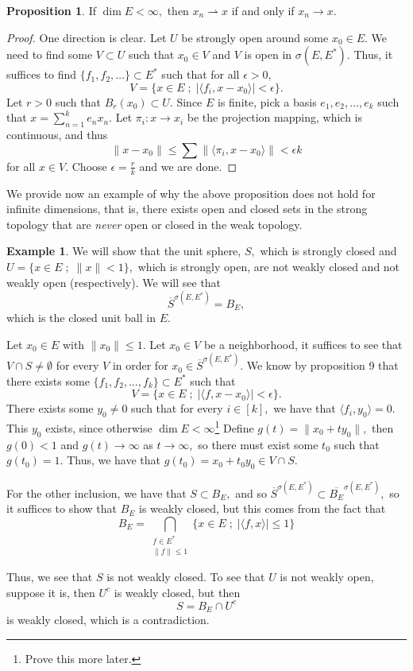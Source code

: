 \documentclass[10pt, oneside]{article}
\theoremstyle{definition}
\newtheorem{exmp}{Example}[section]
\newtheorem{prop}{Proposition}
\begin{document}
\begin{prop}
    If $\dim E < \infty,$ then $x_n \rightharpoonup x$ if and only if $x_n \to x.$
\end{prop}
\begin{proof}
    One direction is clear. Let $U$ be strongly open around some $x_0 \in E.$ We need to find some $V\subset U$ such that $x_0 \in V$ and $V$ is open in $\sigma(E, E^*).$ Thus, it suffices to find $\{f_1, f_2, \dots\} \subset E^*$ such that for all $\epsilon>0,$
    \[V= \{x \in E \; ; \; |\langle f_i, x-x_0\rangle| < \epsilon\}.\] Let $r>0$ such that $B_r(x_0)\subset U.$ Since $E$ is finite, pick a basis $e_1, e_2, \dots, e_k$ such that $x = \sum_{n=1}^k e_nx_n.$ Let $\pi_i: x\to x_i$ be the projection mapping, which is continuous, and thus 
    \[\|x - x_0\|\leq \sum \|\langle \pi_i, x-x_0\rangle\| < \epsilon k\] for all $x\in V.$ Choose $\epsilon = \frac{r}{k}$ and we are done.
\end{proof}

We provide now an example of why the above proposition does not hold for infinite dimensions, that is, there exists open and closed sets in the strong topology that are \textit{never} open or closed in the weak topology.
\begin{exmp}
    We will show that the unit sphere, $S,$ which is strongly closed and $U = \{x \in E \; ; \; \|x\| <1\},$ which is strongly open, are not weakly closed and not weakly open (respectively). We will see that
    \[\overline{S}^{\sigma(E, E^*)} = B_E,\] which is the closed unit ball in $E.$ 

    Let $x_0\in E$ with $\|x_0\| \leq 1.$ Let $x_0\in V$ be a neighborhood, it suffices to see that $V \cap S \neq \emptyset$ for every $V$ in order for $x_0\in \overline{S}^{\sigma(E, E^*)}.$ We know by proposition 9 that there exists some $\{f_1, f_2, \dots, f_k\}\subset E^*$ such that 
    \[V = \{x \in E \; ; \; |\langle f, x-x_0\rangle| < \epsilon\}.\] There exists some $y_0 \neq 0$ such that for every $i \in [k],$ we have that $\langle f_i, y_0\rangle = 0.$ This $y_0$ exists, since otherwise $\dim E < \infty$\footnote{Prove this more later.} Define $g(t) = \|x_0 + ty_0\|,$ then $g(0) < 1$ and $g(t) \to \infty$ as $t\to \infty,$ so there must exist some $t_0$ such that $g(t_0) = 1.$ Thus, we have that $g(t_0) = x_0 + t_0y_0 \in V \cap S.$

    For the other inclusion, we have that $S\subset B_E,$ and so $\overline{S}^{\sigma(E, E^*)}\subset \overline{B_E}^{\sigma(E, E^*)},$ so it suffices to show that $B_E$ is weakly closed, but this comes from the fact that 
    \[B_E = \bigcap_{\substack{f\in E^*\\\|f\| \leq 1}} \{x \in E \; ; \; |\langle f, x\rangle| \leq 1\}\]

    Thus, we see that $S$ is not weakly closed. To see that $U$ is not weakly open, suppose it is, then $U^c$ is weakly closed, but then 
    \[S = B_E \cap U^c\] is weakly closed, which is a contradiction.
\end{exmp}
\end{document}
